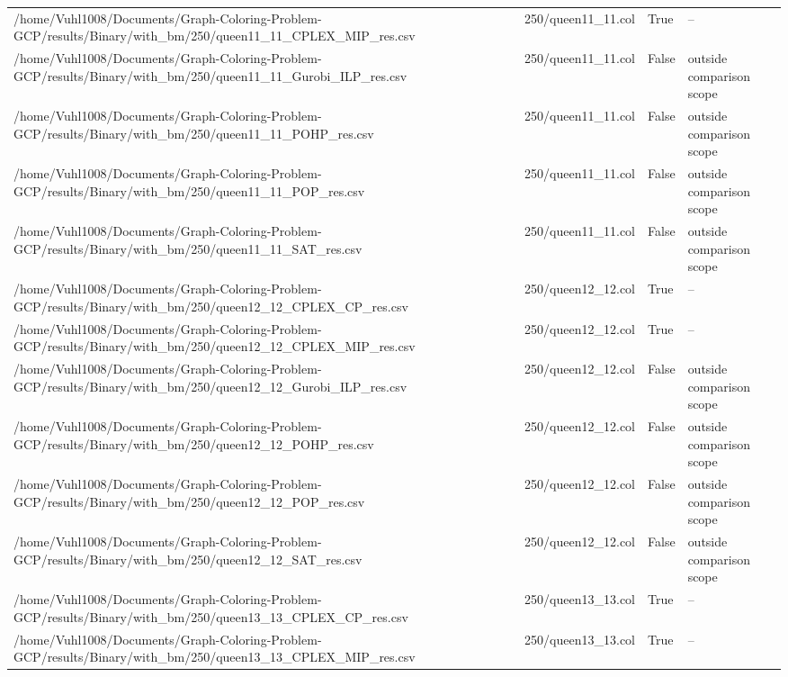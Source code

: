 \begin{table}[htbp]
\begin{tabular}{llll}
/home/Vuhl1008/Documents/Graph-Coloring-Problem-GCP/results/Binary/with\_bm/250/queen11\_11\_CPLEX\_MIP\_res.csv & 250/queen11\_11.col & True & -- \\
/home/Vuhl1008/Documents/Graph-Coloring-Problem-GCP/results/Binary/with\_bm/250/queen11\_11\_Gurobi\_ILP\_res.csv & 250/queen11\_11.col & False & outside comparison scope \\
/home/Vuhl1008/Documents/Graph-Coloring-Problem-GCP/results/Binary/with\_bm/250/queen11\_11\_POHP\_res.csv & 250/queen11\_11.col & False & outside comparison scope \\
/home/Vuhl1008/Documents/Graph-Coloring-Problem-GCP/results/Binary/with\_bm/250/queen11\_11\_POP\_res.csv & 250/queen11\_11.col & False & outside comparison scope \\
/home/Vuhl1008/Documents/Graph-Coloring-Problem-GCP/results/Binary/with\_bm/250/queen11\_11\_SAT\_res.csv & 250/queen11\_11.col & False & outside comparison scope \\
/home/Vuhl1008/Documents/Graph-Coloring-Problem-GCP/results/Binary/with\_bm/250/queen12\_12\_CPLEX\_CP\_res.csv & 250/queen12\_12.col & True & -- \\
/home/Vuhl1008/Documents/Graph-Coloring-Problem-GCP/results/Binary/with\_bm/250/queen12\_12\_CPLEX\_MIP\_res.csv & 250/queen12\_12.col & True & -- \\
/home/Vuhl1008/Documents/Graph-Coloring-Problem-GCP/results/Binary/with\_bm/250/queen12\_12\_Gurobi\_ILP\_res.csv & 250/queen12\_12.col & False & outside comparison scope \\
/home/Vuhl1008/Documents/Graph-Coloring-Problem-GCP/results/Binary/with\_bm/250/queen12\_12\_POHP\_res.csv & 250/queen12\_12.col & False & outside comparison scope \\
/home/Vuhl1008/Documents/Graph-Coloring-Problem-GCP/results/Binary/with\_bm/250/queen12\_12\_POP\_res.csv & 250/queen12\_12.col & False & outside comparison scope \\
/home/Vuhl1008/Documents/Graph-Coloring-Problem-GCP/results/Binary/with\_bm/250/queen12\_12\_SAT\_res.csv & 250/queen12\_12.col & False & outside comparison scope \\
/home/Vuhl1008/Documents/Graph-Coloring-Problem-GCP/results/Binary/with\_bm/250/queen13\_13\_CPLEX\_CP\_res.csv & 250/queen13\_13.col & True & -- \\
/home/Vuhl1008/Documents/Graph-Coloring-Problem-GCP/results/Binary/with\_bm/250/queen13\_13\_CPLEX\_MIP\_res.csv & 250/queen13\_13.col & True & -- \\

\end{tabular}
\end{table}
